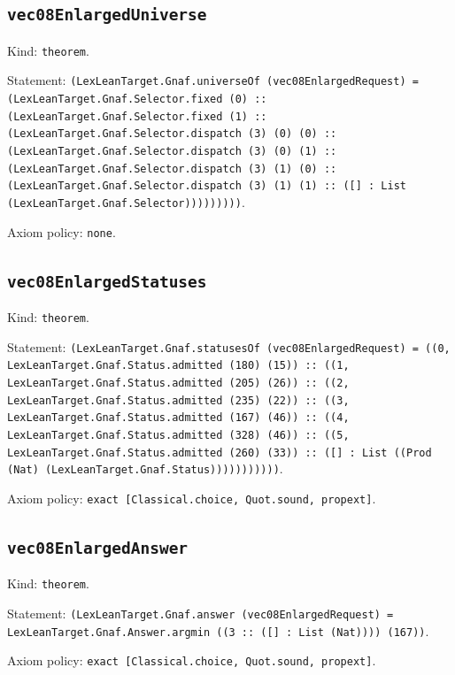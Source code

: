 \documentclass[11pt]{article}
\begin{document}
\subsection*{\texttt{vec08EnlargedUniverse}}
\noindent Kind: \texttt{theorem}.\par
\noindent Statement: \texttt{(LexLeanTarget.Gnaf.universeOf (vec08EnlargedRequest) = (LexLeanTarget.Gnaf.Selector.fixed (0) :: (LexLeanTarget.Gnaf.Selector.fixed (1) :: (LexLeanTarget.Gnaf.Selector.dispatch (3) (0) (0) :: (LexLeanTarget.Gnaf.Selector.dispatch (3) (0) (1) :: (LexLeanTarget.Gnaf.Selector.dispatch (3) (1) (0) :: (LexLeanTarget.Gnaf.Selector.dispatch (3) (1) (1) :: ([] : List (LexLeanTarget.Gnaf.Selector)))))))))}.\par
\noindent Axiom policy: \texttt{none}.\par
\subsection*{\texttt{vec08EnlargedStatuses}}
\noindent Kind: \texttt{theorem}.\par
\noindent Statement: \texttt{(LexLeanTarget.Gnaf.statusesOf (vec08EnlargedRequest) = ((0, LexLeanTarget.Gnaf.Status.admitted (180) (15)) :: ((1, LexLeanTarget.Gnaf.Status.admitted (205) (26)) :: ((2, LexLeanTarget.Gnaf.Status.admitted (235) (22)) :: ((3, LexLeanTarget.Gnaf.Status.admitted (167) (46)) :: ((4, LexLeanTarget.Gnaf.Status.admitted (328) (46)) :: ((5, LexLeanTarget.Gnaf.Status.admitted (260) (33)) :: ([] : List ((Prod (Nat) (LexLeanTarget.Gnaf.Status)))))))))))}.\par
\noindent Axiom policy: \texttt{exact [Classical.choice, Quot.sound, propext]}.\par
\subsection*{\texttt{vec08EnlargedAnswer}}
\noindent Kind: \texttt{theorem}.\par
\noindent Statement: \texttt{(LexLeanTarget.Gnaf.answer (vec08EnlargedRequest) = LexLeanTarget.Gnaf.Answer.argmin ((3 :: ([] : List (Nat)))) (167))}.\par
\noindent Axiom policy: \texttt{exact [Classical.choice, Quot.sound, propext]}.\par
\end{document}
